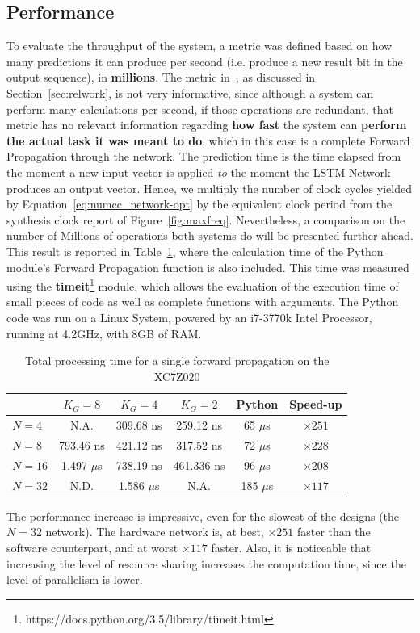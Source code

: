\documentclass{IEEEtran}
\begin{document}
\subsection{Performance}
To evaluate the throughput of the system, a metric was defined based on how many predictions it can produce per second (i.e. produce a new result bit in the output sequence),
in \textbf{millions}. The metric in~\cite{Chang15}, as discussed in Section~\ref{sec:relwork}, is not very informative, since
although a system can perform many calculations per second, if those operations are redundant, that metric has no relevant information
regarding \textbf{how fast} the system can \textbf{perform the actual task it was meant to do}, which in this case is a complete Forward
Propagation through the network. The prediction time is the time elapsed from the moment a new input vector is applied \emph{to} the moment the LSTM
Network produces an output vector. Hence, we multiply the number of clock cycles yielded by Equation~\ref{eq:numcc_network-opt} by the equivalent clock period
from the synthesis clock report of Figure~\ref{fig:maxfreq}. Nevertheless, a comparison on the number of Millions of operations both systems do will be presented further ahead.
This result is reported in Table~\ref{tab:process-time}, where the calculation time of the Python module's Forward Propagation function is
also included. This time was measured using the \textbf{timeit}\footnote{https://docs.python.org/3.5/library/timeit.html}  module, which allows
the evaluation of the execution time of small pieces of code as well as complete functions with arguments. The Python code was run on a Linux System,
powered by an i7-3770k Intel Processor, running at 4.2GHz, with 8GB of RAM.

\begin{table}
	\caption{Total processing time for a single forward propagation on the XC7Z020}
	\label{tab:process-time}
    \centering
    \begin{tabular}{ | l | c | c | c | c | c | }
    \hline
    & $K_G=8$  & $K_G=4$ & $K_G=2$ & Python & Speed-up \\
    \hline
    $N=4$ & N.A.  & 309.68 ns  & 259.12 ns & 65 $\mu$s & $\times251$ \\
    \hline
    $N=8$ & 793.46 ns  & 421.12 ns  &  317.52 ns & 72 $\mu$s & $\times228$ \\
    \hline
    $N=16$ & 1.497 $\mu$s  & 738.19 ns  & 461.336 ns & 96 $\mu$s & $\times208$ \\
    \hline
    $N=32$ & N.D.          & 1.586 $\mu$s & N.A.       & 185 $\mu$s  &  $\times117$ \\
		\hline
  \end{tabular}
\end{table}
The performance increase is impressive, even for the slowest of the designs (the $N=32$ network). The hardware network is, at best, $\times251$ faster than the software counterpart,
and at worst $\times117$ faster. Also, it is noticeable that increasing the level of resource sharing increases the computation time, since the level of parallelism is lower.
\end{document}
